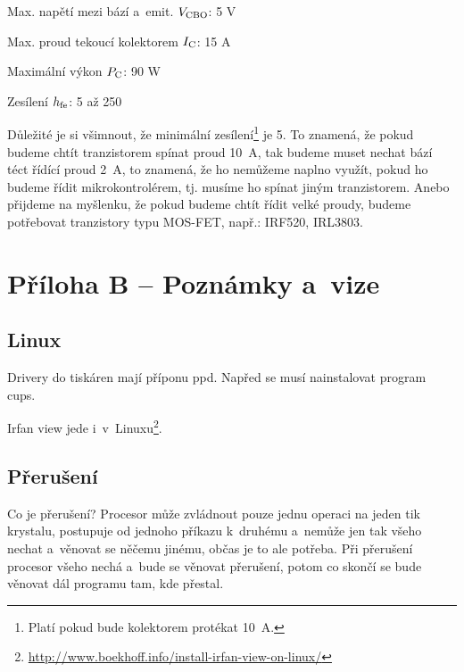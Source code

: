 Max. napětí mezi bází a~emit. $V \rm _{CBO}$: 5 V

Max. proud tekoucí kolektorem $I \rm _C$: 15 A

Maximální výkon $P \rm _C$: 90 W

Zesílení $h \rm _{fe}$: 5 až 250

Důležité je si všimnout, že minimální zesílení\footnote{Platí pokud bude kolektorem protékat 10~A.}  je 5. 
To znamená, že pokud budeme chtít tranzistorem spínat proud 10~A, tak budeme muset nechat bází téct řídící proud 2~A,
 to znamená, že ho nemůžeme naplno využít, pokud ho budeme řídit mikrokontrolérem, tj. musíme ho spínat jiným tranzistorem. 
 Anebo přijdeme na myšlenku, že pokud budeme chtít řídit velké proudy, budeme potřebovat tranzistory typu MOS-FET, např.: IRF520, IRL3803.




\section{ Příloha B -- Poznámky a~vize}

\subsection{Linux}

Drivery do tiskáren mají příponu ppd. Napřed se musí nainstalovat program cups. 

Irfan view jede i~v~Linuxu\footnote{\url{http://www.boekhoff.info/install-irfan-view-on-linux/}}.



\subsection{Přerušení}

Co je přerušení? Procesor může zvládnout pouze jednu operaci na jeden tik krystalu, 
postupuje od jednoho příkazu k~druhému a~nemůže jen tak všeho nechat a~věnovat se něčemu jinému, občas je to ale potřeba.
 Při přerušení procesor všeho nechá a~bude se věnovat přerušení, potom co skončí se bude věnovat dál programu tam, kde přestal. 

